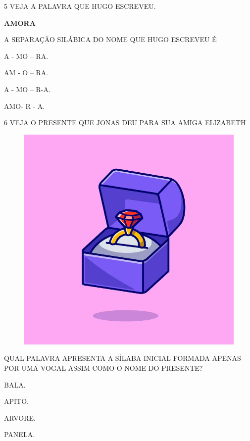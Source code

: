 \num{5} VEJA A PALAVRA QUE HUGO ESCREVEU.

\begin{myquote}
\begin{center}
\textbf{AMORA}
\end{center}
\end{myquote}

A SEPARAÇÃO SILÁBICA DO NOME QUE HUGO ESCREVEU É

\begin{escolha}

\item A - MO – RA.

\item AM - O – RA.

\item A - MO – R-A.

\item AMO- R - A.

\end{escolha}

\num{6} VEJA O PRESENTE QUE JONAS DEU PARA SUA AMIGA ELIZABETH

\begin{figure}[H]
\centering
\includegraphics[width=.6\textwidth]{./media/image224.png}
\end{figure}

QUAL PALAVRA APRESENTA A SÍLABA INICIAL FORMADA APENAS POR UMA VOGAL ASSIM COMO O NOME DO PRESENTE?

\begin{escolha}

\item BALA.

\item APITO.

\item ARVORE.

\item PANELA.

\end{escolha}

